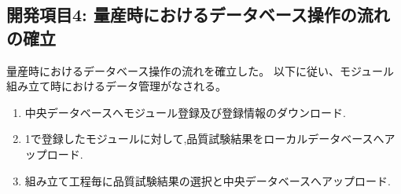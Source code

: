 \clearpage
\subsection{開発項目4: 量産時におけるデータベース操作の流れの確立}\label{sec:design_QC_flow}
量産時におけるデータベース操作の流れを確立した。
以下に従い、モジュール組み立て時におけるデータ管理がなされる。
\begin{enumerate}
  \item 中央データベースへモジュール登録及び登録情報のダウンロード.
  \item 1で登録したモジュールに対して,品質試験結果をローカルデータベースへアップロード.
  \item 組み立て工程毎に品質試験結果の選択と中央データベースへアップロード.
\end{enumerate}

